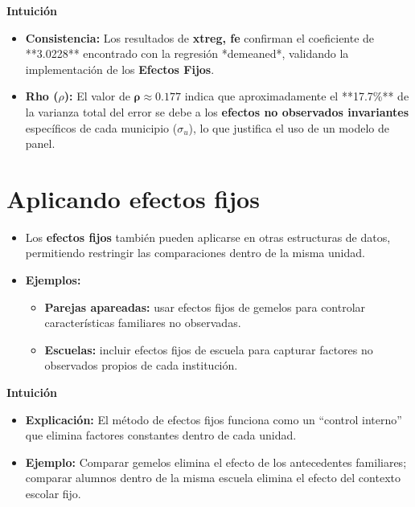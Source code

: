 \documentclass[12pt]{article}
\begin{document}
\vspace{0.3cm}

\noindent\textbf{Intuición}
\begin{itemize}
    \item \textbf{Consistencia:} Los resultados de \textbf{xtreg, fe} confirman el coeficiente de **3.0228** encontrado con la regresión *demeaned*, validando la implementación de los \textbf{Efectos Fijos}.
    \item \textbf{Rho ($\rho$):} El valor de $\mathbf{\rho \approx 0.177}$ indica que aproximadamente el **17.7\%** de la varianza total del error se debe a los \textbf{efectos no observados invariantes} específicos de cada municipio ($\sigma_u$), lo que justifica el uso de un modelo de panel.
\end{itemize}

\section*{\noindent\textbf{Aplicando efectos fijos}}

\begin{itemize}
    \item Los \textbf{efectos fijos} también pueden aplicarse en otras estructuras de datos, permitiendo restringir las comparaciones dentro de la misma unidad.
    
    \item \textbf{Ejemplos:}
    \begin{itemize}
        \item \textbf{Parejas apareadas:} usar efectos fijos de gemelos para controlar características familiares no observadas.
        \item \textbf{Escuelas:} incluir efectos fijos de escuela para capturar factores no observados propios de cada institución.
    \end{itemize}
\end{itemize}

\noindent\textbf{Intuición}
\begin{itemize}
    \item \textbf{Explicación:} El método de efectos fijos funciona como un “control interno” que elimina factores constantes dentro de cada unidad.
    \item \textbf{Ejemplo:} Comparar gemelos elimina el efecto de los antecedentes familiares; comparar alumnos dentro de la misma escuela elimina el efecto del contexto escolar fijo.
\end{itemize}
\end{document}
